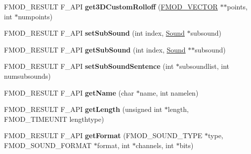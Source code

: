 \begin{DoxyCompactItemize}
\item 
\hypertarget{class_f_m_o_d_1_1_sound_aeff4d197c2a9edc1dd746b519d63f490}{F\-M\-O\-D\-\_\-\-R\-E\-S\-U\-L\-T F\-\_\-\-A\-P\-I {\bfseries get3\-D\-Custom\-Rolloff} (\hyperlink{struct_f_m_o_d___v_e_c_t_o_r}{F\-M\-O\-D\-\_\-\-V\-E\-C\-T\-O\-R} $\ast$$\ast$points, int $\ast$numpoints)}\label{class_f_m_o_d_1_1_sound_aeff4d197c2a9edc1dd746b519d63f490}

\item 
\hypertarget{class_f_m_o_d_1_1_sound_ab326892db719b2e98dc0d14b91b0a17c}{F\-M\-O\-D\-\_\-\-R\-E\-S\-U\-L\-T F\-\_\-\-A\-P\-I {\bfseries set\-Sub\-Sound} (int index, \hyperlink{class_f_m_o_d_1_1_sound}{Sound} $\ast$subsound)}\label{class_f_m_o_d_1_1_sound_ab326892db719b2e98dc0d14b91b0a17c}

\item 
\hypertarget{class_f_m_o_d_1_1_sound_ae1f9dd4b19f536a11850961348d6210f}{F\-M\-O\-D\-\_\-\-R\-E\-S\-U\-L\-T F\-\_\-\-A\-P\-I {\bfseries get\-Sub\-Sound} (int index, \hyperlink{class_f_m_o_d_1_1_sound}{Sound} $\ast$$\ast$subsound)}\label{class_f_m_o_d_1_1_sound_ae1f9dd4b19f536a11850961348d6210f}

\item 
\hypertarget{class_f_m_o_d_1_1_sound_a8d7e00c75eb46132351ff14069097cd0}{F\-M\-O\-D\-\_\-\-R\-E\-S\-U\-L\-T F\-\_\-\-A\-P\-I {\bfseries set\-Sub\-Sound\-Sentence} (int $\ast$subsoundlist, int numsubsounds)}\label{class_f_m_o_d_1_1_sound_a8d7e00c75eb46132351ff14069097cd0}

\item 
\hypertarget{class_f_m_o_d_1_1_sound_a448ce4d402d03d76c79f289565cae2c2}{F\-M\-O\-D\-\_\-\-R\-E\-S\-U\-L\-T F\-\_\-\-A\-P\-I {\bfseries get\-Name} (char $\ast$name, int namelen)}\label{class_f_m_o_d_1_1_sound_a448ce4d402d03d76c79f289565cae2c2}

\item 
\hypertarget{class_f_m_o_d_1_1_sound_a3f0b77ce74332b1f358816eedfc6ca02}{F\-M\-O\-D\-\_\-\-R\-E\-S\-U\-L\-T F\-\_\-\-A\-P\-I {\bfseries get\-Length} (unsigned int $\ast$length, F\-M\-O\-D\-\_\-\-T\-I\-M\-E\-U\-N\-I\-T lengthtype)}\label{class_f_m_o_d_1_1_sound_a3f0b77ce74332b1f358816eedfc6ca02}

\item 
\hypertarget{class_f_m_o_d_1_1_sound_a3b74a166eab897c4b01795aac95eceb1}{F\-M\-O\-D\-\_\-\-R\-E\-S\-U\-L\-T F\-\_\-\-A\-P\-I {\bfseries get\-Format} (F\-M\-O\-D\-\_\-\-S\-O\-U\-N\-D\-\_\-\-T\-Y\-P\-E $\ast$type, F\-M\-O\-D\-\_\-\-S\-O\-U\-N\-D\-\_\-\-F\-O\-R\-M\-A\-T $\ast$format, int $\ast$channels, int $\ast$bits)}\label{class_f_m_o_d_1_1_sound_a3b74a166eab897c4b01795aac95eceb1}


\end{DoxyCompactItemize}
